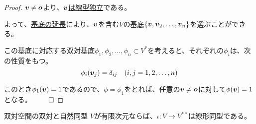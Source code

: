 \documentclass[../../../topic_linear-algebra]{subfiles}
\begin{document}
\begin{proof}
  $\vb*{v} \neq \vb*{o}$より、\hyperref[thm:single-vec-indep-iff-nonzero]{$\vb*{v}$は線型独立}である。
  
  よって、\hyperref[thm:basis-extension]{基底の延長}により、$\vb*{v}$を含む$V$の基底$\{ \vb*{v}, \vb*{v}_2, \dots, \vb*{v}_n \}$を選ぶことができる。
  
  \br
  
  この基底に対応する双対基底${\phi_1, \phi_2, \dots, \phi_n} \subset V^*$を考えると、それぞれの$\phi_i$は、次の性質をもつ。
  \begin{equation*}
    \phi_i(\vb*{v}_j) = \delta_{ij} \quad (i,j=1,2,\dots,n)
  \end{equation*}
  
  このとき$\phi_1(\vb*{v}) = 1$であるので、$\phi = \phi_1$をとれば、任意の$\vb*{v} \neq \vb*{o}$に対して$\phi(\vb*{v}) = 1$となる。 $\qed$
\end{proof}

\br

\begin{theorem}{双対空間の双対と自然同型}
  $V$が有限次元ならば、$\iota \colon V \to V^{**}$は線形同型である。
\end{theorem}
\end{document}
